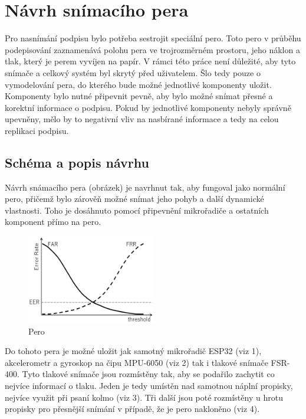 \chapter{Návrh snímacího pera}
Pro nasnímání podpisu bylo potřeba sestrojit speciální pero.                                        %
Toto pero v průběhu podepisování zaznamenává polohu pera ve trojrozměrném prostoru,                 %
jeho náklon a tlak, který je perem vyvíjen na papír.                                                %
V rámci této práce není důležité, aby tyto snímače a celkový systém byl skrytý před uživatelem.     %
Šlo tedy pouze o vymodelování pera, do kterého bude možné jednotlivé komponenty uložit.             %
Komponenty bylo nutné připevnit pevně, aby bylo možné snímat přesné a korektní informace o podpisu. %
Pokud by jednotlivé komponenty nebyly správně upevněny,                                             %
mělo by to negativní vliv na nasbírané informace a tedy na celou replikaci podpisu.                 %
 
\section{Schéma a popis návrhu}
Návrh snámacího pera (obrázek) je navrhnut tak, aby fungoval jako normální pero, 
přičemž bylo zárověň možné snímat jeho pohyb a další dynamické vlastnosti.
Toho je dosáhnuto pomocí připevnění mikrořadiče a ostatních komponent přímo na pero.

\begin{figure}[h]\label{fig:pero}
  \centering
  \includegraphics[width=0.5\textwidth]{obrazky-figures/FAR_FRR.png}
  \caption{Pero} 
\end{figure}

Do tohoto pera je možné uložit jak samotný mikrořadič ESP32 (viz 1), akcelerometr a gyroskop na čipu MPU-6050 (viz 2) tak i tlakové snímače FSR-400.
Tyto tlakové snímače jsou rozmístěny tak, aby se podařilo zachytit co nejvíce informací o tlaku.
Jeden je tedy umístěn nad samotnou náplní propisky, nejvíce využit při psaní kolmo (viz 3).
Tři další jsou poté rozmístěny u hrotu propisky pro přesnější snímání v případě, že je pero nakloněno (viz 4). 


